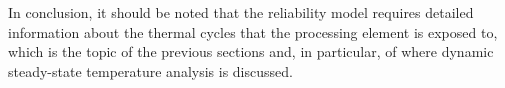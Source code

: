 In conclusion, it should be noted that the reliability model requires detailed
information about the thermal cycles that the processing element is exposed to,
which is the topic of the previous sections and, in particular, of
 where dynamic steady-state temperature analysis is
discussed.
